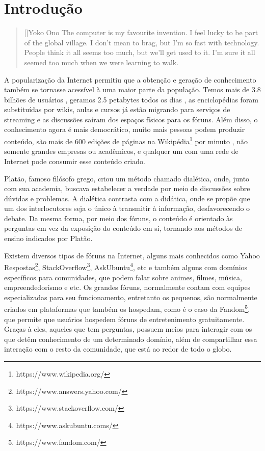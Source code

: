 \chapter{Introdução}
\label{cap:introduction}

\begin{quotation}[]{Yoko Ono}
The computer is my favourite invention. I feel lucky to be part of the global village. I don't mean to brag, but I'm so fast with technology. People think it all seems too much, but we'll get used to it. I'm sure it all seemed too much when we were learning to walk.
\end{quotation}

A popularização da Internet permitiu que a obtenção e geração de conhecimento também se tornasse acessível à uma maior parte da população. Temos mais de 3.8 bilhões de usuários \cite{dataneversleeps6}, geramos 2.5 petabytes todos os dias \cite{dataperday}, as enciclopédias foram substituídas por wikis, aulas e cursos já estão migrando para serviços de streaming e as discussões saíram dos espaços físicos para os fóruns. Além disso, o conhecimento agora é mais democrático, muito mais pessoas podem produzir conteúdo, são mais de 600 edições de páginas na Wikipédia\footnote{https://www.wikipedia.org/} por minuto \cite{dataneversleeps5}, não somente grandes empresas ou acadêmicos, e qualquer um com uma rede de Internet pode consumir esse conteúdo criado. 

Platão, famoso filósofo grego, criou um método chamado dialética, onde, junto com sua academia, buscava estabelecer a verdade por meio de discussões sobre dúvidas e problemas. A dialética contrasta com a didática, onde se propõe que um dos interlocutores seja o único à transmitir à informação, desfavorecendo o debate. Da mesma forma, por meio dos fóruns, o conteúdo é orientado às perguntas em vez da exposição do conteúdo em si, tornando aos métodos de ensino indicados por Platão. 

Existem diversos tipos de fóruns na Internet, alguns mais conhecidos como Yahoo Respostas\footnote{https://www.answers.yahoo.com/}, StackOverflow\footnote{https://www.stackoverflow.com/}, AskUbuntu\footnote{https://www.askubuntu.coms/}, etc e também alguns com domínios específicos para comunidades, que podem falar sobre animes, filmes, música, empreendedorismo e etc. Os grandes fóruns, normalmente contam com equipes especializadas para seu funcionamento, entretanto os pequenos, são normalmente criados em plataformas que também os hospedam, como é o caso da Fandom\footnote{https://www.fandom.com/}, que permite que usuários hospedem fóruns de entretenimento gratuitamente. Graças à eles, aqueles que tem perguntas, possuem meios para interagir com os que detêm conhecimento de um determinado domínio, além de compartilhar essa interação com o resto da comunidade, que está ao redor de todo o globo.

